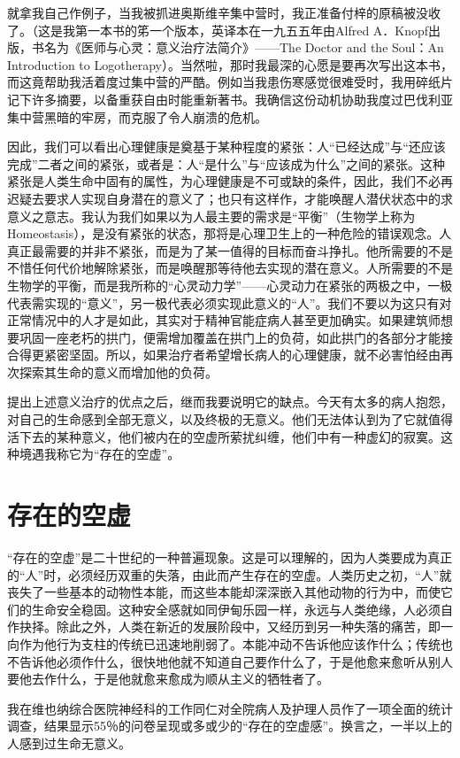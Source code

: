 \documentclass[11pt,oneside]{book}
\begin{document}
\begin{common-format}
就拿我自己作例子，当我被抓进奥斯维辛集中营时，我正准备付梓的原稿被没收了。（这是我第一本书的笫一个版本，英译本在一九五五年由Alfred A．Knopf出版，书名为《医师与心灵：意义治疗法简介》——The Doctor and the Soul：An Introduction to Logotherapy）。当然啦，那时我最深的心愿是要再次写出这本书，而这竟帮助我活着度过集中营的严酷。例如当我患伤寒感觉很难受时，我用碎纸片记下许多摘要，以备重获自由时能重新著书。我确信这份动机协助我度过巴伐利亚集中营黑暗的牢房，而克服了令人崩溃的危机。

因此，我们可以看出心理健康是奠基于某种程度的紧张：人“已经达成”与“还应该完成”二者之间的紧张，或者是：人“是什么”与“应该成为什么”之间的紧张。这种紧张是人类生命中固有的属性，为心理健康是不可或缺的条件，因此，我们不必再迟疑去要求人实现自身潜在的意义了；也只有这样作，才能唤醒人潜伏状态中的求意义之意志。我认为我们如果以为人最主要的需求是“平衡”（生物学上称为Homeostasis），是没有紧张的状态，那将是心理卫生上的一种危险的错误观念。人真正最需要的并非不紧张，而是为了某一值得的目标而奋斗挣扎。他所需要的不是不惜任何代价地解除紧张，而是唤醒那等待他去实现的潜在意义。人所需要的不是生物学的平衡，而是我所称的“心灵动力学”——心灵动力在紧张的两极之中，一极代表需实现的“意义”，另一极代表必须实现此意义的“人”。我们不要以为这只有对正常情况中的人才是如此，其实对于精神官能症病人甚至更加确实。如果建筑师想要巩固一座老朽的拱门，便需增加覆盖在拱门上的负荷，如此拱门的各部分才能接合得更紧密坚固。所以，如果治疗者希望增长病人的心理健康，就不必害怕经由再次探索其生命的意义而增加他的负荷。

提出上述意义治疗的优点之后，继而我要说明它的缺点。今天有太多的病人抱怨，对自己的生命感到全部无意义，以及终极的无意义。他们无法体认到为了它就值得活下去的某种意义，他们被内在的空虚所萦扰纠缠，他们中有一种虚幻的寂寞。这种境遇我称它为“存在的空虚”。


\section{存在的空虚}
“存在的空虚”是二十世纪的一种普遍现象。这是可以理解的，因为人类要成为真正的“人”时，必须经历双重的失落，由此而产生存在的空虚。人类历史之初，“人”就丧失了一些基本的动物性本能，而这些本能却深深嵌入其他动物的行为中，而使它们的生命安全稳固。这种安全感就如同伊甸乐园一样，永远与人类绝缘，人必须自作抉择。除此之外，人类在新近的发展阶段中，又经历到另一种失落的痛苦，即一向作为他行为支柱的传统已迅速地削弱了。本能冲动不告诉他应该作什么；传统也不告诉他必须作什么，很快地他就不知道自己要作什么了，于是他愈来愈听从别人要他去作什么，于是他就愈来愈成为顺从主义的牺牲者了。

我在维也纳综合医院神经科的工作同仁对全院病人及护理人员作了一项全面的统计调查，结果显示55％的问卷呈现或多或少的“存在的空虚感”。换言之，一半以上的人感到过生命无意义。


\end{common-format}
\end{document}
